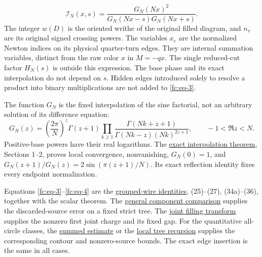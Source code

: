 \begin{equation}\label{fc:eq-4}
\mathcal I_N(x,s)=
 \frac{G_N(Nx)^2}{G_N(Nx-s)G_N(Nx+s)}.
\end{equation}
 The integer \(w(D)\) is the oriented writhe of the original filled diagram, and \(n_v\) are its original signed crossing powers. The variables \(x_e\) are the normalized Newton indices on its physical quarter-turn edges. They are internal summation variables, distinct from the raw color \(x\) in \(M=-qx\). The single reduced-cut factor \(H_N(s)\) is outside this expression. The base phase and its exact interpolation do not depend on \(s\). Hidden edges introduced solely to resolve a product into binary multiplications are not added to \eqref{fc:eq-3}.

The function \(G_N\) is the fixed interpolation of the sine factorial, not an arbitrary solution of its difference equation:
\begin{equation}\label{fc:eq-4a}
G_N(z)=\left(\frac{2\pi}{N}\right)^z\Gamma(z+1)
 \prod_{k\ge1}
 \frac{\Gamma(Nk+z+1)}
      {\Gamma(Nk-z)(Nk)^{2z+1}},\qquad -1<\Re z<N.
\end{equation}
 Positive-base powers have their real logarithms. The \href{https://sashakolpakov.github.io/murakamis_dream/notes/exact_factorial_interpolation_and_complex_contours.html}{exact interpolation theorem}, Sections 1--2, proves local convergence, nonvanishing, \(G_N(0)=1\), and \(G_N(z+1)/G_N(z)=2\sin(\pi(z+1)/N)\). Its exact reflection identity fixes every endpoint normalization.

Equations \eqref{fc:eq-3}--\eqref{fc:eq-4} are the \href{https://sashakolpakov.github.io/murakamis_dream/notes/actual_main_meridian_grouped_wire_packet.html}{grouped-wire identities}, (25)--(27), (34a)--(36), together with the scalar theorem. The \href{https://sashakolpakov.github.io/murakamis_dream/notes/actual_main_meridian_general_component_comparison.html}{general component comparison} supplies the discarded-source error on a fixed strict tree. The \href{https://sashakolpakov.github.io/murakamis_dream/notes/actual_main_meridian_joint_filling_transform.html}{joint filling transform} supplies the nonzero first joint charge and its fixed gap. For the quantitative all-circle classes, the \href{https://sashakolpakov.github.io/murakamis_dream/notes/actual_all_circle_curvature_filling_limit.html}{summed estimate} or the \href{https://sashakolpakov.github.io/murakamis_dream/notes/actual_all_circle_local_message_volume.html}{local tree recursion} supplies the corresponding contour and nonzero-source bounds. The exact edge insertion is the same in all cases.

